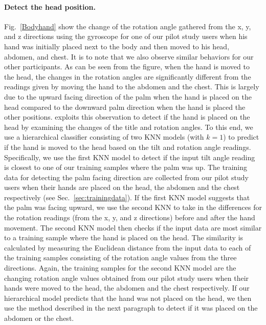 
\paragraph{Detect the head position.}
Fig.~\ref{Bodyhand} show the change of the rotation angle gathered from the x, y, and z directions using the gyroscope for one of our pilot
study users when his hand was initially placed next to the body and then moved to his head, abdomen, and chest. It is to note that we also
observe similar behaviors for our other participants. As can be seen from the figure, when the hand is moved to the head, the changes in
the rotation angles are significantly different from the readings given by moving the hand to the abdomen and the chest. This is largely
due to the upward facing direction of the palm when the hand is placed on the head compared to the downward palm direction when the hand is
placed the other positions. \systemname exploits this observation to detect if the hand is placed on the head by examining the changes of
the title and rotation angles. To this end, we use a hierarchical classifier consisting of two KNN models (with $k=1$) to predict if the
hand is moved to the head based on the tilt and rotation angle readings. Specifically, we use the first KNN model to detect if the input
tilt angle reading is closest to one of our training samples where the palm was up. The training data for detecting the palm facing
direction are collected from our pilot study users when their hands are placed on the head, the abdomen and the chest respectively (see Sec.~\ref{sec:trainingdata}). If the
first KNN model suggests that the palm was facing upward, we use the second KNN to take in the differences for the rotation readings
(from the x, y, and z directions) before and after the hand movement. The second KNN model then checks if the input data are most similar
to a training sample where the hand is placed on the head. The similarity is calculated by measuring the Euclidean distance from the input
data to each of the training samples consisting of the rotation angle values from the three directions. Again, the training samples for the
second KNN model are the changing rotation angle values obtained from our pilot study users when their hands were moved to the head, the
abdomen and the chest respectively. If our hierarchical model predicts that the hand was not placed on the head, we then use the method
described in the next paragraph to detect if it was placed on the abdomen or the chest.

